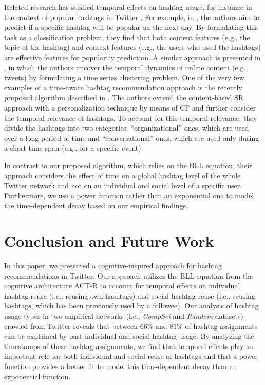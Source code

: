 \documentclass{sig-alternate-05-2015}
\begin{document}
Related research has studied temporal effects on hashtag usage, for instance in the context of popular hashtags in Twitter \cite{lin2012study,lehmann2012dynamical,tsur2012,ma2012will}. For example, in \cite{ma2012will}, the authors aim to predict if a specific hashtag will be popular on the next day. By formulating this task as a classification problem, they find that both content features (e.g., the topic of the hashtag) and context features (e.g., the users who used the hashtags) are effective features for popularity prediction. A similar approach is presented in \cite{yang2011patterns}, in which the authors uncover the temporal dynamics of online content (e.g., tweets) by formulating a time series clustering problem. One of the very few examples of a time-aware hashtag recommendation approach is the recently proposed algorithm described in \cite{harvey2015long}. The authors extend the content-based SR approach \cite{zangerle2011recommending} with a personalization technique by means of CF and further consider the temporal relevance of hashtags. To account for this temporal relevance, they divide the hashtags into two categories: ``organizational'' ones, which are used over a long period of time and ``conversational'' ones, which are used only during a short time span (e.g., for a specific event).

In contrast to our proposed algorithm, which relies on the BLL equation, their approach considers the effect of time on a global hashtag level of the whole Twitter network and not on an individual and social level of a specific user. Furthermore, we use a power function rather than an exponential one to model the time-dependent decay based on our empirical findings.\section{Conclusion and Future Work} \label{sec:conclusion}
In this paper, we presented a cognitive-inspired approach for hashtag recommendations in Twitter. Our approach utilizes the BLL equation from the cognitive architecture ACT-R to account for temporal effects on individual hashtag reuse (i.e., reusing own hashtags) and social hashtag reuse (i.e., reusing hashtags, which has been previously used by a followee). Our analysis of hashtag usage types in two empirical networks (i.e., \textit{CompSci}{} and \textit{Random}{} datasets) crawled from Twitter reveals that between 66\% and 81\% of hashtag assignments can be explained by past individual and social hashtag usage. By analyzing the timestamps of these hashtag assignments, we find that temporal effects play an important role for both individual and social reuse of hashtags and that a power function provides a better fit to model this time-dependent decay than an exponential function.
%
\end{document}
